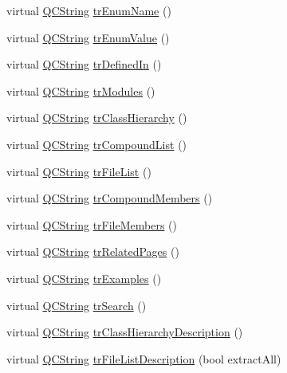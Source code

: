 \begin{DoxyCompactItemize}
\item 
virtual \hyperlink{class_q_c_string}{Q\-C\-String} \hyperlink{class_translator_slovak_a50df17e22ad96870c7937be7e1ab8dfc}{tr\-Enum\-Name} ()
\item 
virtual \hyperlink{class_q_c_string}{Q\-C\-String} \hyperlink{class_translator_slovak_a5b1d2d5c6825641661ff2cfaeb84307e}{tr\-Enum\-Value} ()
\item 
virtual \hyperlink{class_q_c_string}{Q\-C\-String} \hyperlink{class_translator_slovak_a5ee5473527c64fc3827deca81e253acf}{tr\-Defined\-In} ()
\item 
virtual \hyperlink{class_q_c_string}{Q\-C\-String} \hyperlink{class_translator_slovak_aef7bca894dd93b7fd6803518cede7ef7}{tr\-Modules} ()
\item 
virtual \hyperlink{class_q_c_string}{Q\-C\-String} \hyperlink{class_translator_slovak_a6676bf94846fa80e4a23cf9ea3214b54}{tr\-Class\-Hierarchy} ()
\item 
virtual \hyperlink{class_q_c_string}{Q\-C\-String} \hyperlink{class_translator_slovak_adc612d045d0abf0cfa5085254fca8db5}{tr\-Compound\-List} ()
\item 
virtual \hyperlink{class_q_c_string}{Q\-C\-String} \hyperlink{class_translator_slovak_a1c967abf4f2578ff4185ab2e10f71e14}{tr\-File\-List} ()
\item 
virtual \hyperlink{class_q_c_string}{Q\-C\-String} \hyperlink{class_translator_slovak_a05e152ef7d0c15bb2b34fc12e1a25c56}{tr\-Compound\-Members} ()
\item 
virtual \hyperlink{class_q_c_string}{Q\-C\-String} \hyperlink{class_translator_slovak_ae5ab09d67500e729b9f1b29f4ea57425}{tr\-File\-Members} ()
\item 
virtual \hyperlink{class_q_c_string}{Q\-C\-String} \hyperlink{class_translator_slovak_a8ed40826492d6303375b3031fc88d3b2}{tr\-Related\-Pages} ()
\item 
virtual \hyperlink{class_q_c_string}{Q\-C\-String} \hyperlink{class_translator_slovak_a29f3ce9451daa973dcde36e7d0cab549}{tr\-Examples} ()
\item 
virtual \hyperlink{class_q_c_string}{Q\-C\-String} \hyperlink{class_translator_slovak_a6a284cb12ea8d274211aa42dad4654c4}{tr\-Search} ()
\item 
virtual \hyperlink{class_q_c_string}{Q\-C\-String} \hyperlink{class_translator_slovak_a7697957dd30cb62ae6635bdd99b828b3}{tr\-Class\-Hierarchy\-Description} ()
\item 
virtual \hyperlink{class_q_c_string}{Q\-C\-String} \hyperlink{class_translator_slovak_adca38ddeb72745fe24c61ff08af9e6c4}{tr\-File\-List\-Description} (bool extract\-All)

\end{DoxyCompactItemize}
